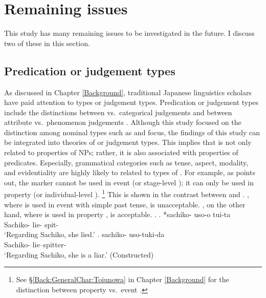 \section{Remaining issues}

This study has many remaining issues to be investigated in the future.
I discuss two of these in this section.


\subsection{Predication or judgement types}

As discussed in Chapter \ref{Background},
traditional Japanese linguistics scholars have paid attention to
 types or judgement types.
Predication or judgement types include the distinctions between  vs.~categorical judgements and between attribute vs.~phenomenon judgements
\cite{matsushita28,yamada36,mio48,kuroda72,masuoka08,kageyama12}.
Although this study focused on the distinction among nominal types such as  and focus,
the findings of this study can be integrated into theories of  or judgement types.
This implies that  is not only related to properties of NPs;
rather, it is also associated with properties of predicates.
Especially, grammatical categories such as tense, aspect, modality, and evidentiality are highly likely to related to types of .
For example, as  points out,
the  marker  cannot be used in event  (or stage-level );
it can only be used in property  (or individual-level ).%
 \footnote{
 See \S \ref{Back:GeneralChar:Toiunowa} in Chapter \ref{Background}
 for the distinction between property vs.~event .
 }
This is shown in the contrast between \Next[a] and \Next[b].
\Next[a], where  is used in event  with simple past tense,
is unacceptable.
\Next[b],
on the other hand, where  is used in property ,
is acceptable.
%
\ex.
 \ag. *sachiko- uso-o tui-ta \\
      Sachiko- lie- spit- \\
      `Regarding Sachiko, she lied.'
     \hfill{\cite[p.~96]{masuoka12}}
 \bg. sachiko- uso-tuki-da \\
      Sachiko- lie--spitter- \\
      `Regarding Sachiko, she is a liar.'
     \hfill{(Constructed)}

